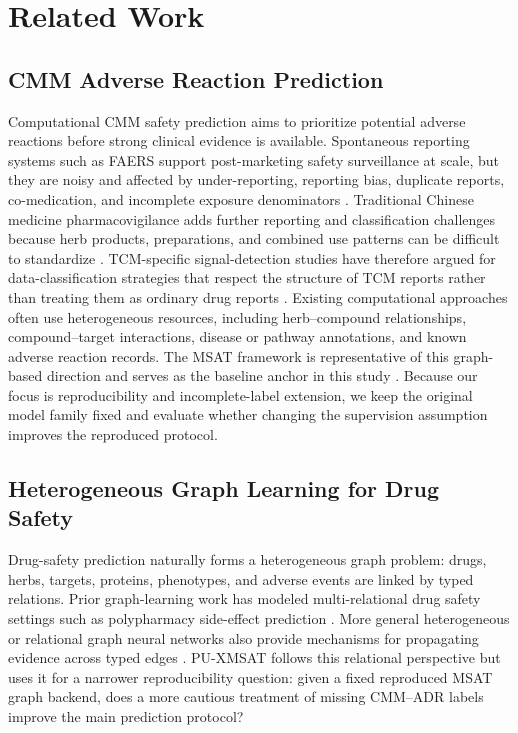 \documentclass[manuscript,screen,review]{acmart}
\newcommand{\msat}{MSAT}
\newcommand{\px}{PU-XMSAT}
\begin{document}
\section{Related Work}

\subsection{CMM Adverse Reaction Prediction}

Computational CMM safety prediction aims to prioritize potential adverse reactions before strong clinical evidence is available. Spontaneous reporting systems such as FAERS support post-marketing safety surveillance at scale, but they are noisy and affected by under-reporting, reporting bias, duplicate reports, co-medication, and incomplete exposure denominators \cite{fda_faers,hazell2006underreporting,harpaz2012novel}. Traditional Chinese medicine pharmacovigilance adds further reporting and classification challenges because herb products, preparations, and combined use patterns can be difficult to standardize \cite{chan2015overview,wu2010recommendations}. TCM-specific signal-detection studies have therefore argued for data-classification strategies that respect the structure of TCM reports rather than treating them as ordinary drug reports \cite{wei2018tcm_signal}. Existing computational approaches often use heterogeneous resources, including herb--compound relationships, compound--target interactions, disease or pathway annotations, and known adverse reaction records. The \msat{} framework is representative of this graph-based direction and serves as the baseline anchor in this study \cite{msat_original}. Because our focus is reproducibility and incomplete-label extension, we keep the original model family fixed and evaluate whether changing the supervision assumption improves the reproduced protocol.

\subsection{Heterogeneous Graph Learning for Drug Safety}

Drug-safety prediction naturally forms a heterogeneous graph problem: drugs, herbs, targets, proteins, phenotypes, and adverse events are linked by typed relations. Prior graph-learning work has modeled multi-relational drug safety settings such as polypharmacy side-effect prediction \cite{zitnik2018modeling}. More general heterogeneous or relational graph neural networks also provide mechanisms for propagating evidence across typed edges \cite{schlichtkrull2018modeling,hu2020heterogeneous}. \px{} follows this relational perspective but uses it for a narrower reproducibility question: given a fixed reproduced \msat{} graph backend, does a more cautious treatment of missing CMM--ADR labels improve the main prediction protocol?
\end{document}
